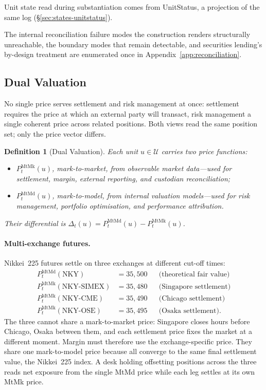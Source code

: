 \documentclass[11pt,a4paper]{article}
\newtheorem{definition}{Definition}[section]
\begin{document}
Unit state read during substantiation comes from UnitStatus, a projection of the same log (\S\ref{sec:states-unitstatus}).

The internal reconciliation failure modes the construction renders structurally unreachable, the boundary modes that remain detectable, and securities lending's by-design treatment are enumerated once in Appendix~\ref{app:reconciliation}.

\subsection{Dual Valuation}

No single price serves settlement and risk management at once: settlement requires the price at which an external party will transact, risk management a single coherent price across related positions. Both views read the same position set; only the price vector differs.

\begin{definition}[Dual Valuation]
Each unit $u\in\mathcal{U}$ carries two price functions:
\begin{itemize}[nosep]
\item $P_t^{\text{MtMk}}(u)$, mark-to-market, from observable market data---used for settlement, margin, external reporting, and custodian reconciliation;
\item $P_t^{\text{MtMd}}(u)$, mark-to-model, from internal valuation models---used for risk management, portfolio optimisation, and performance attribution.
\end{itemize}
Their differential is $\Delta_t(u)=P_t^{\text{MtMd}}(u)-P_t^{\text{MtMk}}(u)$.
\end{definition}

\paragraph{Multi-exchange futures.} Nikkei~225 futures settle on three exchanges at different cut-off times:
\begin{align*}
P_t^{\text{MtMd}}(\text{NKY}) &= 35{,}500 && \text{(theoretical fair value)}\\
P_t^{\text{MtMk}}(\text{NKY-SIMEX}) &= 35{,}480 && \text{(Singapore settlement)}\\
P_t^{\text{MtMk}}(\text{NKY-CME}) &= 35{,}490 && \text{(Chicago settlement)}\\
P_t^{\text{MtMk}}(\text{NKY-OSE}) &= 35{,}495 && \text{(Osaka settlement)}.
\end{align*}
The three cannot share a mark-to-market price: Singapore closes hours before Chicago, Osaka between them, and each settlement price fixes the market at a different moment. Margin must therefore use the exchange-specific price. They share one mark-to-model price because all converge to the same final settlement value, the Nikkei~225 index. A desk holding offsetting positions across the three reads net exposure from the single MtMd price while each leg settles at its own MtMk price.
\end{document}
